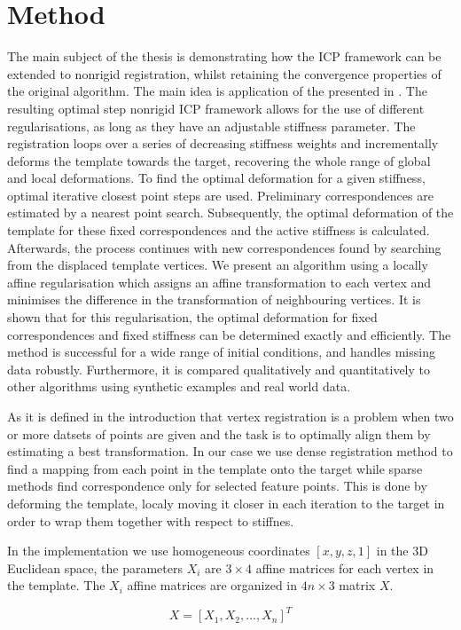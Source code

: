 \documentclass[../structure.tex]{subfiles}
\begin{document}
\chapter{Method}
\hspace{2em}The main subject of the thesis is demonstrating how the ICP framework can be extended to nonrigid registration, whilst retaining the convergence properties of the original algorithm. The main idea is application of the presented in \cite{Amberg2007}. The resulting optimal step nonrigid ICP framework allows for the use of different regularisations, as long as they have an adjustable stiffness parameter. The registration loops over a series of decreasing stiffness weights and incrementally deforms the template towards the target, recovering the whole range of global and local deformations. To find the optimal deformation for a given stiffness, optimal iterative closest point steps are used. Preliminary correspondences are estimated by a nearest point search. Subsequently, the optimal deformation of the template for these fixed correspondences and the active stiffness is calculated. Afterwards, the process continues with new correspondences found by searching from the displaced template vertices. We present an algorithm using a locally affine regularisation which assigns an affine transformation to each vertex and minimises the difference in the transformation of neighbouring vertices. It is shown that for this regularisation, the optimal deformation for fixed correspondences and fixed stiffness can be determined exactly and efficiently. The method is successful for a wide range of initial conditions, and handles missing data robustly. Furthermore, it is compared qualitatively and quantitatively to other algorithms using synthetic examples and real world data.

\hspace{2em}As it is defined in the introduction that vertex registration is a problem when two or more datsets of points are given and the task is to optimally align them by estimating a best transformation. In our case we use dense registration method to find a mapping from each point in the template onto the target while sparse methods find correspondence only for selected feature points. This is done by deforming the template, localy moving it closer in each iteration to the target in order to wrap them together with respect to stiffnes.

\hspace{2em}In the implementation we use homogeneous coordinates $[x,y,z,1]$ in the 3D Euclidean space, the parameters $X_i$ are $3\times4$  affine matrices for each vertex in the template. The $X_i$ affine matrices are organized in $4n\times3$ matrix $X$.

\begin{equation}
X = [X_1, X_2, ... ,X_n]^T
\end{equation}
\end{document}
